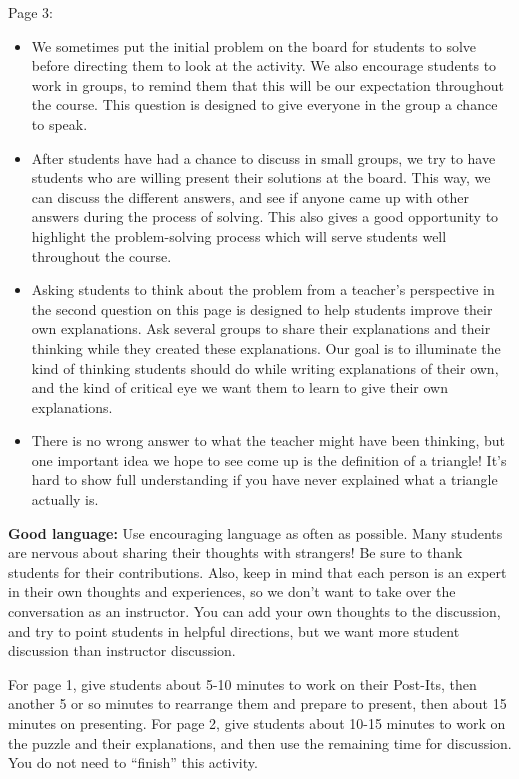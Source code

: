 \documentclass {ximera}
\begin{document}
\begin{instructorNotes}
Page 3:
\begin{itemize}


\item We sometimes put the initial problem on the board for students to solve before directing them to look at the activity.  We also encourage students to work in groups, to remind them that this will be our expectation throughout the course.  This question is designed to give everyone in the group a chance to speak.

\item After students have had a chance to discuss in small groups, we try to have students who are willing present their solutions at the board.  This way, we can discuss the different answers, and see if anyone came up with other answers during the process of solving.  This also gives a good opportunity to highlight the problem-solving process which will serve students well throughout the course.

\item Asking students to think about the problem from a teacher's perspective in the second question on this page is designed to help students improve their own explanations. Ask several groups to share their explanations and their thinking while they created these explanations. Our goal is to illuminate the kind of thinking students should do while writing explanations of their own, and the kind of critical eye we want them to learn to give their own explanations.

\item There is no wrong answer to what the teacher might have been thinking, but one important idea we hope to see come up is the definition of a triangle! It's hard to show full understanding if you have never explained what a triangle actually is.
\end{itemize}


{\bf Good language:}                                                                                                                                                   
Use encouraging language as often as possible. Many students are nervous about sharing their thoughts with strangers! Be sure to thank students for their contributions. Also, keep in mind that each person is an expert in their own thoughts and experiences, so we don't want to take over the conversation as an instructor. You can add your own thoughts to the discussion, and try to point students in helpful directions, but we want more student discussion than instructor discussion.






\timing For page 1, give students about 5-10 minutes to work on their Post-Its, then another 5 or so minutes to rearrange them and prepare to present, then about 15 minutes on presenting. For page 2, give students about 10-15 minutes to work on the puzzle and their explanations, and then use the remaining time for discussion. You do not need to ``finish'' this activity.


\end{instructorNotes}
\end{document}
